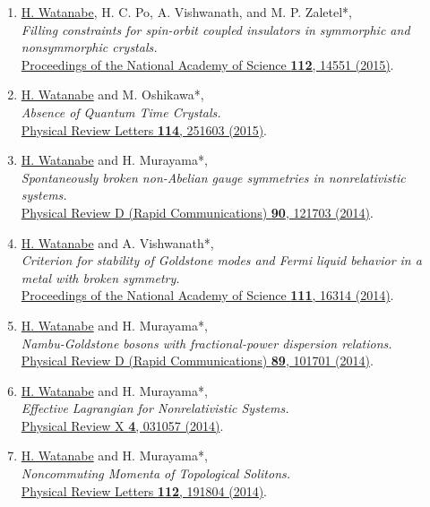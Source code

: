 \documentclass[letterpaper,11pt]{article}
\begin{document}
\begin{enumerate}
\item \underline{H. Watanabe}, H. C. Po, A. Vishwanath, and M. P. Zaletel*, \\\emph{Filling constraints for spin-orbit coupled insulators in symmorphic and nonsymmorphic crystals.}\\{\href{https://doi.org/10.1073/pnas.1514665112}{Proceedings of the National Academy of Science {\bf 112}, 14551 (2015)}.}

\item \underline{H. Watanabe} and M. Oshikawa*, \\\emph{Absence of Quantum Time Crystals.}\\{\href{https://doi.org/10.1103/PhysRevLett.114.251603}{Physical Review Letters {\bf 114}, 251603 (2015)}.}

\item \underline{H. Watanabe} and H. Murayama*, \\\emph{Spontaneously broken non-Abelian gauge symmetries in nonrelativistic systems.}\\{\href{https://doi.org/10.1103/PhysRevD.90.121703}{Physical Review D (Rapid Communications) {\bf 90}, 121703 (2014)}.}

\item \underline{H. Watanabe} and A. Vishwanath*, \\\emph{Criterion for stability of Goldstone modes and Fermi liquid behavior in a metal with broken symmetry.}\\{\href{https://doi.org/10.1073/pnas.1415592111}{Proceedings of the National Academy of Science {\bf 111}, 16314 (2014)}.}

\item \underline{H. Watanabe} and H. Murayama*, \\\emph{Nambu-Goldstone bosons with fractional-power dispersion relations.}\\{\href{https://doi.org/10.1103/PhysRevD.89.101701}{Physical Review D (Rapid Communications) {\bf 89}, 101701 (2014)}.}

\item \underline{H. Watanabe} and H. Murayama*, \\\emph{Effective Lagrangian for Nonrelativistic Systems.}\\{\href{https://doi.org/10.1103/PhysRevX.4.031057}{Physical Review X {\bf 4}, 031057 (2014)}.}

\item \underline{H. Watanabe} and H. Murayama*, \\\emph{Noncommuting Momenta of Topological Solitons.}\\{\href{https://doi.org/10.1103/PhysRevLett.112.191804}{Physical Review Letters {\bf 112}, 191804 (2014)}.}


\end{enumerate}
\end{document}
